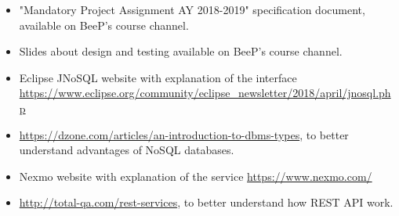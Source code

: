 
%

\begin{itemize}
\item "Mandatory Project Assignment AY 2018-2019" specification document, available on BeeP's course channel.
\item Slides about design and testing available on BeeP's course channel.
\item Eclipse JNoSQL website with explanation of the interface \url{https://www.eclipse.org/community/eclipse_newsletter/2018/april/jnosql.php}
\item \url{https://dzone.com/articles/an-introduction-to-dbms-types}, to better understand advantages of NoSQL databases.
\item Nexmo website with explanation of the service \url{https://www.nexmo.com/}
\item \url{http://total-qa.com/rest-services}, to better understand how REST API work.
\end{itemize}

%